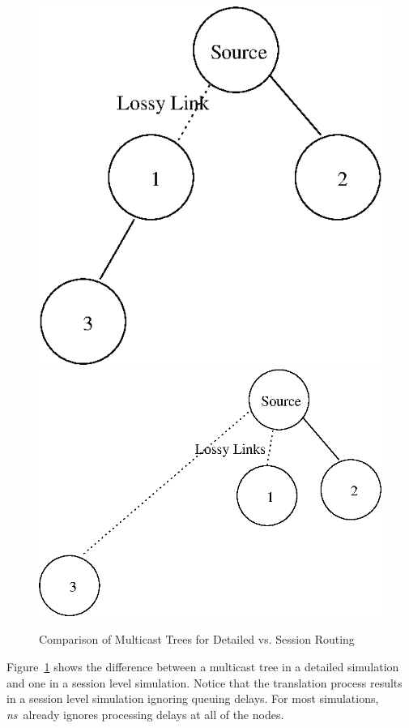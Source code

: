 \begin{figure}
  \centerline{\includegraphics{regularTree}\hfil\includegraphics{sessionTree}}
  \caption{Comparison of Multicast Trees for Detailed vs. Session Routing}
  \label{fig:conversions}
\end{figure}
Figure~\ref{fig:conversions} shows the difference between a
multicast tree in a detailed simulation and one in a session level simulation.
Notice that the translation process results in a session level simulation
ignoring queuing delays.
For most simulations, \emph{ns}\ already ignores processing delays at all of the nodes.

